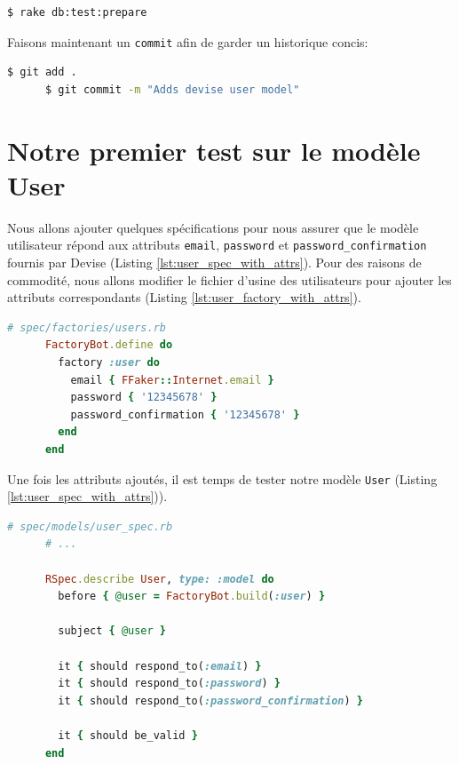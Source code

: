 \documentclass[]{report}
\begin{document}
    \begin{scriptsize}
      \begin{lstlisting}[language=bash]
      $ rake db:test:prepare
      \end{lstlisting}
    \end{scriptsize}

    Faisons maintenant un \verb|commit| afin de garder un historique concis:

    \begin{scriptsize}
      \begin{lstlisting}[language=bash]
      $ git add .
      $ git commit -m "Adds devise user model"
      \end{lstlisting}
    \end{scriptsize}

  \section{Notre premier test sur le modèle User}

    Nous allons ajouter quelques spécifications pour nous assurer que le modèle utilisateur répond aux attributs \verb|email|, \verb|password| et \verb|password_confirmation| fournis par Devise (Listing \ref{lst:user_spec_with_attrs}). Pour des raisons de commodité, nous allons modifier le fichier d'usine des utilisateurs pour ajouter les attributs correspondants (Listing \ref{lst:user_factory_with_attrs}).

    \begin{scriptsize}
      \begin{lstlisting}[language=ruby, caption={Usine d'utilisateurs avec les attributs}, label={lst:user_factory_with_attrs}]
      # spec/factories/users.rb
      FactoryBot.define do
        factory :user do
          email { FFaker::Internet.email }
          password { '12345678' }
          password_confirmation { '12345678' }
        end
      end
      \end{lstlisting}
    \end{scriptsize}

    Une fois les attributs ajoutés, il est temps de tester notre modèle \verb|User| (Listing \ref{lst:user_spec_with_attrs})).

    \begin{scriptsize}
      \begin{lstlisting}[language=ruby, caption={Test pour les attributs Devise}, label={lst:user_spec_with_attrs}]
      # spec/models/user_spec.rb
      # ...

      RSpec.describe User, type: :model do
        before { @user = FactoryBot.build(:user) }

        subject { @user }

        it { should respond_to(:email) }
        it { should respond_to(:password) }
        it { should respond_to(:password_confirmation) }

        it { should be_valid }
      end
      \end{lstlisting}
    \end{scriptsize}
\end{document}
